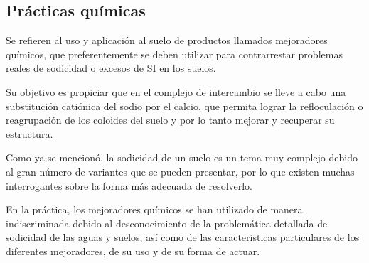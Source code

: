 \subsection{Prácticas químicas}
Se refieren al uso y aplicación al suelo de productos llamados mejoradores químicos, que preferentemente se deben utilizar para contrarrestar problemas reales de sodicidad o excesos de SI en los suelos.

Su objetivo es propiciar que en el complejo de intercambio se lleve a cabo una substitución catiónica del sodio por el calcio, que permita lograr la refloculación o reagrupación de los coloides del suelo y por lo tanto mejorar y recuperar su estructura.

Como ya se mencionó, la sodicidad de un suelo es un tema muy complejo debido al gran número de variantes que se pueden presentar, por lo que existen muchas interrogantes sobre la forma más adecuada de resolverlo.

En la práctica, los mejoradores químicos se han utilizado de manera indiscriminada debido al desconocimiento de la problemática detallada de sodicidad de las aguas y suelos, así como de las características particulares de los diferentes mejoradores, de su uso y de su forma de actuar.

